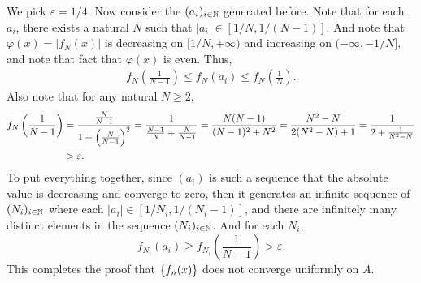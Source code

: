 \documentclass[12pt]{article}
\begin{document}
\begin{fproof}[1(b)]
    We pick \(\varepsilon = 1/4\). Now consider the \((a_i)_{i \in \mathbb {N}}\) generated before. Note that for each \(a_i\), there exists a natural \(N\) such that \(|a_i| \in [1/N, 1/(N-1)]\).
    And note that \(\varphi(x)= |f_N(x)|\) is decreasing on \([1/N, +\infty)\) and increasing on \((-\infty, -1/N]\), and note that fact that \(\varphi(x)\) is even.
    Thus,
    \begin{align*}
        f_N\left(\frac{1}{N-1}\right) \leq f_N(a_i) \leq f_N\left(\frac{1}{N}\right).
    \end{align*}
    Also note that for any natural \(N\geq 2\),
    \begin{align*}
        f_N \left( \frac{1}{N-1} \right) &= \frac{\frac{N}{N-1}}{1 + \left( \frac{N}{N-1} \right)^2} = \frac{1}{\frac{N-1}{N} + \frac{N}{N-1}} = \frac{N(N-1)}{(N-1)^2 + N^2} = \frac{N^2 - N}{2(N^2 - N) + 1} = \frac{1}{2 + \frac{1}{N^2-N}} \\
        &> \varepsilon.
    \end{align*}
    To put everything together, since \((a_i)\) is such a sequence that the absolute value is decreasing and converge to zero, then it generates an infinite sequence of \((N_i)_{i\in \mathbb {N}}\) where each \(|a_i| \in [1/N_i, 1/(N_i-1)]\), and there are infinitely many distinct elements in the sequence \((N_i)_{i \in \mathbb {N}}\).
    And for each \(N_i\), \[f_{N_i}(a_i) \geq f_{N_i}\left(\frac{1}{N-1}\right) > \varepsilon.\]
    This completes the proof that \(\left\{ f_n(x) \right\}\) does not converge uniformly on \(A\).

\end{fproof}
\newpage

\begin{fproof}[2(a)]

\end{fproof}

\begin{fproof}[2(b)]

\end{fproof}

\begin{fproof}[2(c)]

\end{fproof}
\newpage

\begin{fproof}[3]
  
\end{fproof}
\newpage

\begin{fproof}[4(a)]

\end{fproof}

\begin{fproof}[4(b)]

\end{fproof}

\begin{fproof}[4(c)]

\end{fproof}
\end{document}
